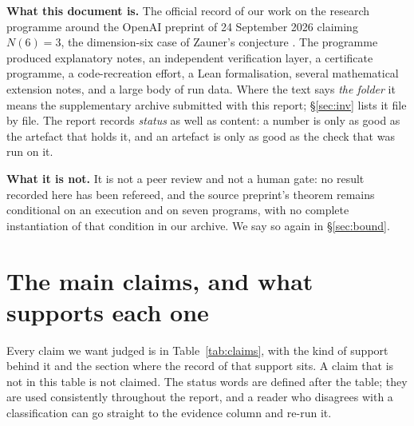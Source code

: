 \documentclass[10pt]{article}
\theoremstyle{definition}
\begin{document}
\begin{tcolorbox}[colback=blue!3,colframe=blue!40!black,boxrule=.6pt,arc=2pt,left=6pt,right=6pt,top=4pt,bottom=4pt]
\textbf{What this document is.} The official record of our work on the research programme around the
OpenAI preprint of 24 September 2026 \cite{ope26} claiming $N(6)=3$, the dimension-six case of
Zauner's conjecture \cite{zauner99}. The programme produced explanatory notes, an independent
verification layer, a certificate programme, a code-recreation effort, a Lean formalisation, several
mathematical extension notes, and a large body of run data. Where the text says \emph{the folder} it
means the supplementary archive submitted with this report; \S\ref{sec:inv} lists it file by file. The report
records \emph{status} as well as content: a number is only as good as the artefact that holds it, and
an artefact is only as good as the check that was run on it.

\textbf{What it is not.} It is not a peer review and not a human gate: no result recorded here has been
refereed, and the source preprint's theorem remains conditional on an execution and on seven programs,
with no complete instantiation of that condition in our archive. We say so again in \S\ref{sec:bound}.
\end{tcolorbox}
\section{The main claims, and what supports each one}\label{sec:claims}

Every claim we want judged is in Table~\ref{tab:claims}, with the kind of support behind it and the
section where the record of that support sits. A claim that is not in this table is not claimed. The
status words are defined after the table; they are used consistently throughout the report, and a
reader who disagrees with a classification can go straight to the evidence column and re-run it.
\end{document}
